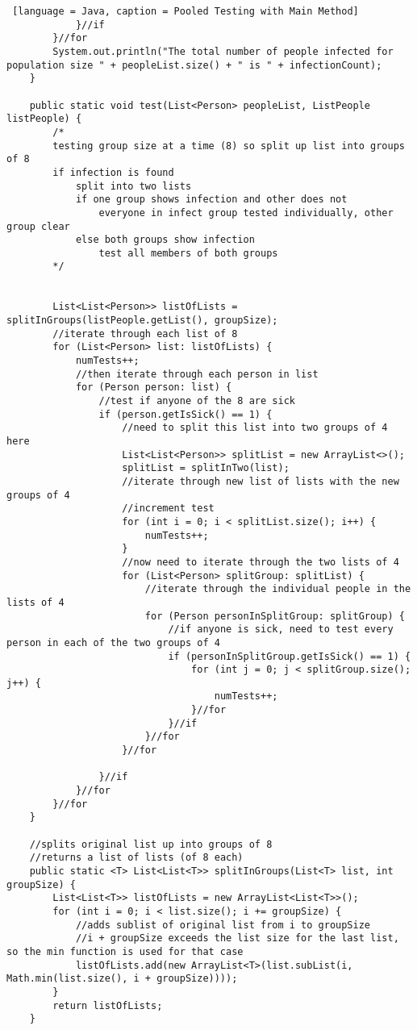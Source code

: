 \documentclass{article}
\begin{document}
\begin{lstlisting} [language = Java, caption = Pooled Testing with Main Method]
            }//if
        }//for
        System.out.println("The total number of people infected for population size " + peopleList.size() + " is " + infectionCount);
    }

    public static void test(List<Person> peopleList, ListPeople listPeople) {
        /*
        testing group size at a time (8) so split up list into groups of 8 
        if infection is found
            split into two lists
            if one group shows infection and other does not
                everyone in infect group tested individually, other group clear
            else both groups show infection
                test all members of both groups
        */

    
        List<List<Person>> listOfLists = splitInGroups(listPeople.getList(), groupSize);
        //iterate through each list of 8 
        for (List<Person> list: listOfLists) {
            numTests++;
            //then iterate through each person in list
            for (Person person: list) {
                //test if anyone of the 8 are sick
                if (person.getIsSick() == 1) {
                    //need to split this list into two groups of 4 here
                    List<List<Person>> splitList = new ArrayList<>();
                    splitList = splitInTwo(list);
                    //iterate through new list of lists with the new groups of 4
                    //increment test
                    for (int i = 0; i < splitList.size(); i++) {
                        numTests++;
                    }
                    //now need to iterate through the two lists of 4
                    for (List<Person> splitGroup: splitList) {
                        //iterate through the individual people in the lists of 4
                        for (Person personInSplitGroup: splitGroup) {
                            //if anyone is sick, need to test every person in each of the two groups of 4
                            if (personInSplitGroup.getIsSick() == 1) {
                                for (int j = 0; j < splitGroup.size(); j++) {
                                    numTests++;
                                }//for
                            }//if
                        }//for
                    }//for

                }//if
            }//for
        }//for
    }

    //splits original list up into groups of 8
    //returns a list of lists (of 8 each)
    public static <T> List<List<T>> splitInGroups(List<T> list, int groupSize) {
        List<List<T>> listOfLists = new ArrayList<List<T>>();
        for (int i = 0; i < list.size(); i += groupSize) {
            //adds sublist of original list from i to groupSize
            //i + groupSize exceeds the list size for the last list, so the min function is used for that case
            listOfLists.add(new ArrayList<T>(list.subList(i, Math.min(list.size(), i + groupSize))));
        }
        return listOfLists;
    }


\end{lstlisting}
\end{document}
